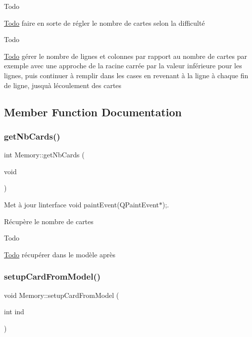 \begin{DoxyRefDesc}{Todo}
\item[\hyperlink{todo__todo000002}{Todo}]faire en sorte de régler le nombre de cartes selon la difficulté \end{DoxyRefDesc}


\begin{DoxyRefDesc}{Todo}
\item[\hyperlink{todo__todo000003}{Todo}]gérer le nombre de lignes et colonnes par rapport au nombre de cartes par exemple avec une approche de la racine carrée par la valeur inférieure pour les lignes, puis continuer à remplir dans les cases en revenant à la ligne à chaque fin de ligne, jusqu\textquotesingle{}à l\textquotesingle{}écoulement des cartes \end{DoxyRefDesc}


\subsection{Member Function Documentation}
\mbox{\label{class_memory_a7c8b57775899a3782edcdf4da430ad61}} 
\subsubsection{\texorpdfstring{get\+Nb\+Cards()}{getNbCards()}}
{\footnotesize\ttfamily int Memory\+::get\+Nb\+Cards (\begin{DoxyParamCaption}\item[{void}]{ }\end{DoxyParamCaption})}



Met à jour l\textquotesingle{}interface  void paint\+Event(\+Q\+Paint\+Event$\ast$);. 

Récupère le nombre de cartes \begin{DoxyRefDesc}{Todo}
\item[\hyperlink{todo__todo000004}{Todo}]récupérer dans le modèle après \end{DoxyRefDesc}
\mbox{\label{class_memory_a296d041ffa5698d725cbf34257c8aeb3}} 
\subsubsection{\texorpdfstring{setup\+Card\+From\+Model()}{setupCardFromModel()}}
{\footnotesize\ttfamily void Memory\+::setup\+Card\+From\+Model (\begin{DoxyParamCaption}\item[{int}]{ind }\end{DoxyParamCaption})}



